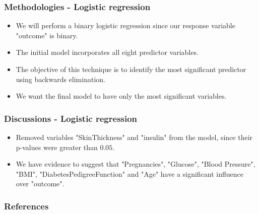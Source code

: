 \documentclass{beamer}
\begin{document}
\begin{frame}
    \frametitle{Methodologies - Logistic regression}
        \begin{itemize}
            \setlength\itemsep{1em}
            \item We will perform a binary logistic regression \cite{faraway2016extending} since our response variable "outcome" is binary.
            \item The initial model incorporates all eight predictor variables.
            \item The objective of this technique is to identify the most significant predictor using backwards elimination.
            \item We want the final model to have only the most significant variables.
        \end{itemize}
\end{frame}

\begin{frame}
    \frametitle{Discussions - Logistic regression}
        \begin{itemize}
            \setlength\itemsep{1em}
            \item Removed variables "SkinThickness" and "insulin" from the model, since their p-values were greater than $0.05$.
            \item We have evidence to suggest that "Pregnancies", "Glucose", "Blood Pressure", "BMI", "DiabetesPedigreeFunction" and "Age" have a significant influence over "outcome".
        \end{itemize}
\end{frame}

\begin{frame}
    \frametitle{References}
     
    
\end{frame}
\end{document}
